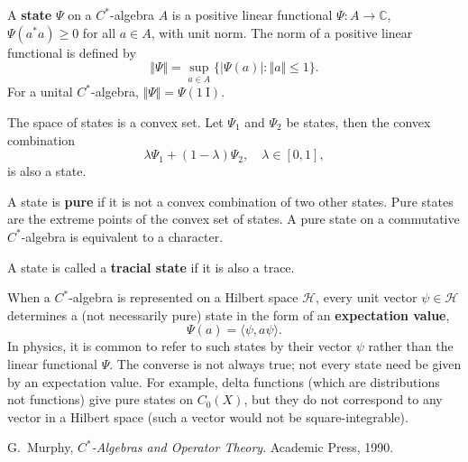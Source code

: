 \documentclass[12pt]{article}
\newcommand*{\Cset}{\mathbb{C}}
\newcommand*{\identity}{\mathord{\mathrm{1\!\!\!\:I}}}
\newcommand*{\norm}[1]{\Vert #1\Vert}
\newcommand*{\hilbert}[1][H]{\mathord{\mathcal{#1}}}
\theoremstyle{inlinedefn}
\theoremstyle{break}
\newcommand*{\defn}[1]{\textbf{#1}}
\begin{document}
A \textbf{state} $\Psi$ on a $C^*$-algebra $A$ is a positive linear functional
$\Psi\colon A \to \Cset$, $\Psi(a^*a) \geq 0$ for all $a \in A$, with unit norm.
The norm of a positive linear functional is defined by
\begin{equation}
\norm{\Psi} = \sup_{a \in A}\{|\Psi(a)| : \norm{a}\leq 1\}.
\end{equation}
For a unital $C^*$-algebra, $\norm{\Psi} = \Psi(\identity)$.

The space of states is a convex set.
Let $\Psi_1$ and $\Psi_2$ be states, then the convex combination
\begin{equation}
\lambda\Psi_1+(1-\lambda)\Psi_2, \quad \lambda \in [0,1],
\end{equation}
is also a state.

A state is \textbf{pure} if it is not a convex combination of two other states.
Pure states are the extreme points of the convex set of states.
A pure state on a commutative $C^*$-algebra is equivalent to a character.

A state is called a \textbf{tracial state} if it is also a trace.

When a $C^*$-algebra is represented on a Hilbert space $\hilbert$,
every unit vector $\psi \in \hilbert$ determines a (not necessarily pure) state in the form of an \defn{expectation value},
\begin{equation}
\Psi(a) = \langle\psi, a\psi\rangle.
\end{equation}
In physics, it is common to refer to such states by their vector $\psi$ rather than the linear functional $\Psi$.
The converse is not always true; not every state need be given by
an expectation value.
For example, delta functions (which are distributions not functions)
give pure states on $C_0(X)$,
but they do not correspond to any vector in a Hilbert space
(such a vector would not be square-integrable).

\begin{thebibliography}{10}
G.~Murphy, {\em $C^*$-Algebras and Operator Theory}.
\newblock Academic Press, 1990.
\end{thebibliography}
\end{document}
